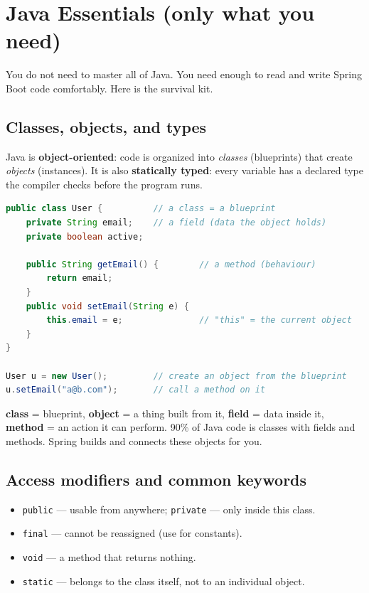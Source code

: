 \documentclass[11pt,a4paper]{article}
\begin{document}
\section{Java Essentials (only what you need)}

You do not need to master all of Java. You need enough to read and write Spring Boot code
comfortably. Here is the survival kit.

\subsection{Classes, objects, and types}

Java is \textbf{object-oriented}: code is organized into \emph{classes} (blueprints) that create
\emph{objects} (instances). It is also \textbf{statically typed}: every variable has a declared
type the compiler checks before the program runs.

\begin{lstlisting}[language=Java]
public class User {          // a class = a blueprint
    private String email;    // a field (data the object holds)
    private boolean active;

    public String getEmail() {        // a method (behaviour)
        return email;
    }
    public void setEmail(String e) {
        this.email = e;               // "this" = the current object
    }
}

User u = new User();         // create an object from the blueprint
u.setEmail("a@b.com");       // call a method on it
\end{lstlisting}

\begin{keyidea}
\textbf{class} = blueprint, \textbf{object} = a thing built from it, \textbf{field} = data inside
it, \textbf{method} = an action it can perform. 90\% of Java code is classes with fields and
methods. Spring builds and connects these objects for you.
\end{keyidea}

\subsection{Access modifiers and common keywords}

\begin{itemize}[leftmargin=*]
  \item \texttt{public} — usable from anywhere; \texttt{private} — only inside this class.
  \item \texttt{final} — cannot be reassigned (use for constants).
  \item \texttt{void} — a method that returns nothing.
  \item \texttt{static} — belongs to the class itself, not to an individual object.
\end{itemize}
\end{document}
